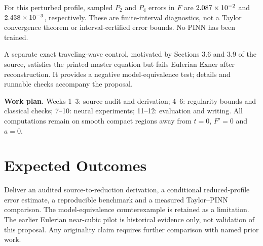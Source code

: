 \documentclass[12pt,a4paper]{article}
\begin{document}
For this perturbed profile, sampled $P_2$ and $P_4$ errors in $F$ are $2.087\times10^{-2}$ and $2.438\times10^{-3}$, respectively. These are finite-interval diagnostics, not a Taylor convergence theorem or interval-certified error bounds. No PINN has been trained.

A separate exact traveling-wave control, motivated by Sections 3.6 and 3.9 of the source, satisfies the printed master equation but fails Eulerian Exner after reconstruction. It provides a negative model-equivalence test; details and runnable checks accompany the proposal.

\textbf{Work plan.} Weeks 1--3: source audit and derivation; 4--6: regularity bounds and classical checks; 7--10: neural experiments; 11--12: evaluation and writing. All computations remain on smooth compact regions away from $t=0$, $F'=0$ and $a=0$.

\section{Expected Outcomes}
Deliver an audited source-to-reduction derivation, a conditional reduced-profile error estimate, a reproducible benchmark and a measured Taylor--PINN comparison. The model-equivalence counterexample is retained as a limitation. The earlier Eulerian near-cubic pilot is historical evidence only, not validation of this proposal. Any originality claim requires further comparison with named prior work.
\end{document}
